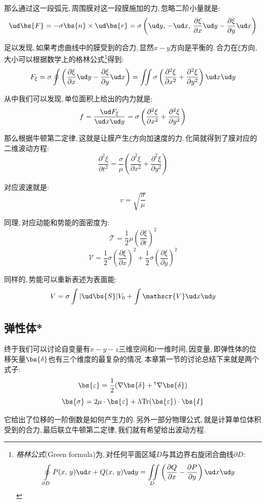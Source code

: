 那么通过这一段弧元,\,周围膜对这一段膜施加的力,\,忽略二阶小量就是:
\[\ud \bs{F}=-\sigma\bs{n}\times \ud\bs{r}=\sigma\left(\ud y,\,-\ud x,\,\frac{\partial \xi}{\partial x}\ud y-\frac{\partial \xi}{\partial y}\ud x\right)\]

足以发现,\,如果考虑曲线中的膜受到的合力,\,显然$x-y$方向是平衡的.\,合力在$\xi$方向,\,大小可以根据数学上的格林公式\footnote{\emph{格林公式}(Green formula)为,\,对任何平面区域$D$与其边界右旋闭合曲线$\partial D$:
\[\oint\limits_{\partial D} P(x,\,y)\ud x+Q(x,\,y)\ud y=\iint\limits_D \left(\frac{\partial Q}{\partial x}-\frac{\partial P}{\partial y}\right)\ud x\ud y\]
}得到:
\[F_\xi=\sigma\oint \left(\frac{\partial \xi}{\partial x}\ud y-\frac{\partial \xi}{\partial y}\ud x\right)=\iint \sigma\left(\frac{\partial^2 \xi}{\partial x^2}+\frac{\partial^2 \xi}{\partial y^2}\right)\ud x\ud y\]

从中我们可以发现,\,单位面积上给出的内力就是:
\[f=\frac{\ud F_\xi}{\ud x\ud y}=\sigma\left(\frac{\partial^2 \xi}{\partial x^2}+\frac{\partial^2 \xi}{\partial y^2}\right)\]

那么根据牛顿第二定律,\,这就是让膜产生$\xi$方向加速度的力.\,化简就得到了膜对应的二维波动方程:
\[\frac{\partial^2 \xi}{\partial t^2}=\frac{\sigma}{\mu}\left(\frac{\partial^2 \xi}{\partial x^2}+\frac{\partial^2 \xi}{\partial y^2}\right)\]

对应波速就是:
\[v=\sqrt{\frac{\sigma}{\mu}}\]

同理,\,对应动能和势能的面密度为:
\[\mathscr{T}=\frac{1}{2}\mu\left(\frac{\partial \xi}{\partial t}\right)^2\]
\[\mathscr{V}=\frac{1}{2}\sigma\left(\frac{\partial \xi}{\partial x}\right)^2+\frac{1}{2}\sigma\left(\frac{\partial \xi}{\partial y}\right)^2\]

同样的,\,势能可以重新表述为表面能:
\[V=\sigma\int|\ud \bs{S}|V_0+\int \mathscr{V}\ud x\ud y\]

\subsection{弹性体*}

终于我们可以讨论自变量有$x-y-z$三维空间和$t$一维时间,\,因变量,\,即弹性体的位移矢量$\bs{\delta}$也有三个维度的最复杂的情况.\,本章第一节的讨论总结下来就是两个式子:
\[\bs{\varepsilon}=\frac{1}{2}(\nabla\bs{\delta}+\phantom{}^{\rm t}\nabla\bs{\delta})\]
\[\bs{\sigma}=2\mu\cdot\bs{\varepsilon}+\lambda {\rm Tr}(\bs{\varepsilon})\cdot\bs{I}\]

它给出了位移的一阶倒数是如何产生力的.\,另外一部分物理公式,\,就是计算单位体积受到的合力,\,最后联立牛顿第二定律,\,我们就有希望给出波动方程.

